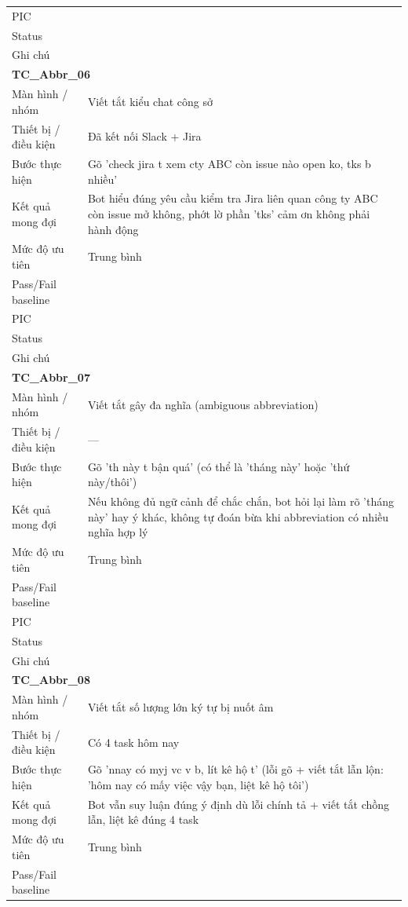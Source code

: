 \documentclass[12pt,a4paper]{article}
\begin{document}
\begin{longtable}{p{3.0cm}p{11.5cm}}
PIC &  \\
Status &  \\
Ghi chú &  \\
\midrule
\multicolumn{2}{l}{\textbf{TC\_Abbr\_06}} \\
Màn hình / nhóm & Viết tắt kiểu chat công sở \\
Thiết bị / điều kiện & Đã kết nối Slack + Jira \\
Bước thực hiện & Gõ 'check jira t xem cty ABC còn issue nào open ko, tks b nhiều' \\
Kết quả mong đợi & Bot hiểu đúng yêu cầu kiểm tra Jira liên quan công ty ABC còn issue mở không, phớt lờ phần 'tks' cảm ơn không phải hành động \\
Mức độ ưu tiên & Trung bình \\
Pass/Fail baseline &  \\
PIC &  \\
Status &  \\
Ghi chú &  \\
\midrule
\multicolumn{2}{l}{\textbf{TC\_Abbr\_07}} \\
Màn hình / nhóm & Viết tắt gây đa nghĩa (ambiguous abbreviation) \\
Thiết bị / điều kiện & — \\
Bước thực hiện & Gõ 'th này t bận quá' (có thể là 'tháng này' hoặc 'thứ này/thôi') \\
Kết quả mong đợi & Nếu không đủ ngữ cảnh để chắc chắn, bot hỏi lại làm rõ 'tháng này' hay ý khác, không tự đoán bừa khi abbreviation có nhiều nghĩa hợp lý \\
Mức độ ưu tiên & Trung bình \\
Pass/Fail baseline &  \\
PIC &  \\
Status &  \\
Ghi chú &  \\
\midrule
\multicolumn{2}{l}{\textbf{TC\_Abbr\_08}} \\
Màn hình / nhóm & Viết tắt số lượng lớn ký tự bị nuốt âm \\
Thiết bị / điều kiện & Có 4 task hôm nay \\
Bước thực hiện & Gõ 'nnay có myj vc v b, lít kê hộ t' (lỗi gõ + viết tắt lẫn lộn: 'hôm nay có mấy việc vậy bạn, liệt kê hộ tôi') \\
Kết quả mong đợi & Bot vẫn suy luận đúng ý định dù lỗi chính tả + viết tắt chồng lẫn, liệt kê đúng 4 task \\
Mức độ ưu tiên & Trung bình \\
Pass/Fail baseline &  \\

\end{longtable}
\end{document}
